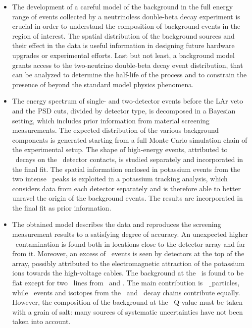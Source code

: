 \chapsummary
\begin{itemize}
  \item The development of a careful model of the background in the full energy range of
    events collected by a neutrinoless double-beta decay experiment is crucial in order to
    understand the composition of background events in the region of interest. The spatial
    distribution of the background sources and their effect in the data is useful
    information in designing future hardware upgrades or experimental efforts. Last but
    not least, a background model grants access to the two-neutrino double-beta decay
    event distribution, that can be analyzed to determine the half-life of the process and
    to constrain the presence of beyond the standard model physics phenomena.
  \item The energy spectrum of single- and two-detector events before the LAr veto and the
    PSD cuts, divided by detector type, is decomposed in a Bayesian setting, which
    includes prior information from material screening measurements. The expected
    distribution of the various background components is generated starting from a full
    Monte Carlo simulation chain of the experimental setup. The shape of high-energy events,
    attributed to \a\ decays on the \pplus\ detector contacts, is studied separately and
    incorporated in the final fit. The spatial information enclosed in potassium events
    from the two intense \g\ peaks is exploited in a potassium tracking analysis, which
    considers data from each detector separately and is therefore able to better
    unravel the origin of the background events. The results are incorporated in the final
    fit as prior information.
  \item The obtained model describes the data and reproduces the screening measurement
    results to a satisfying degree of accuracy. An unexpected higher \kvn\ contamination
    is found both in locations close to the detector array and far from it. Moreover, an
    excess of \kvz\ events is seen by detectors at the top of the array, possibly
    attributed to the electromagnetic attraction of the potassium ions towards the
    high-voltage cables. The background at the \onbb\ is found to be flat except for two
    \g\ lines from \Tl\ and \Bih. The main contribution is \kvz\ \b\ particles, while \a\
    events and isotopes from the \Thh\ and \Uh\ decay chains contribute equally. However,
    the composition of the background at the \onbb\ Q-value must be taken with a grain of
    salt: many sources of systematic uncertainties have not been taken into account.

\end{itemize}
